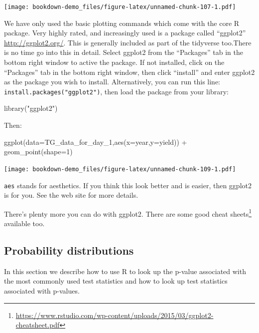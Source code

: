 \documentclass[
]{book}
\newenvironment{Shaded}{\begin{snugshade}}{\end{snugshade}}
\newcommand{\AttributeTok}[1]{\textcolor[rgb]{0.77,0.63,0.00}{#1}}
\newcommand{\DecValTok}[1]{\textcolor[rgb]{0.00,0.00,0.81}{#1}}
\newcommand{\FunctionTok}[1]{\textcolor[rgb]{0.00,0.00,0.00}{#1}}
\newcommand{\NormalTok}[1]{#1}
\newcommand{\SpecialCharTok}[1]{\textcolor[rgb]{0.00,0.00,0.00}{#1}}
\newcommand{\StringTok}[1]{\textcolor[rgb]{0.31,0.60,0.02}{#1}}
\renewcommand{\href}[2]{#2\footnote{\url{#1}}}
\begin{document}
\texttt{[image: bookdown-demo\_files/figure-latex/unnamed-chunk-107-1.pdf]}

We have only used the basic plotting commands which come with the core R package. Very highly rated, and increasingly used is a package called ``ggplot2'' \url{http://ggplot2.org/}. This is generally included as part of the tidyverse too.There is no time go into this in detail. Select ggplot2 from the ``Packages'' tab in the bottom right window to active the package. If not installed, click on the ``Packages'' tab in the bottom right window, then click ``install'' and enter ggplot2 as the package you wish to install. Alternatively, you can run this line: \texttt{install.packages("ggplot2")}, then load the package from your library:

\begin{Shaded}
\begin{Highlighting}[]
\FunctionTok{library}\NormalTok{(}\StringTok{"ggplot2"}\NormalTok{)}
\end{Highlighting}
\end{Shaded}

Then:

\begin{Shaded}
\begin{Highlighting}[]
\FunctionTok{ggplot}\NormalTok{(}\AttributeTok{data=}\NormalTok{TG\_data\_for\_day\_1,}\FunctionTok{aes}\NormalTok{(}\AttributeTok{x=}\NormalTok{year,}\AttributeTok{y=}\NormalTok{yield)) }\SpecialCharTok{+} \FunctionTok{geom\_point}\NormalTok{(}\AttributeTok{shape=}\DecValTok{1}\NormalTok{)}
\end{Highlighting}
\end{Shaded}

\texttt{[image: bookdown-demo\_files/figure-latex/unnamed-chunk-109-1.pdf]}

\texttt{aes} stands for aesthetics. If you think this look better and is easier, then ggplot2 is for you. See the web site for more details.

There's plenty more you can do with ggplot2. There are some good \href{https://www.rstudio.com/wp-content/uploads/2015/03/ggplot2-cheatsheet.pdf}{cheat sheets} available too.

\hypertarget{probability-distributions}{%
\subsection{Probability distributions}\label{probability-distributions}}

In this section we describe how to use R to look up the p-value associated with the most
commonly used test statistics and how to look up test statistics associated with p-values.
\end{document}
